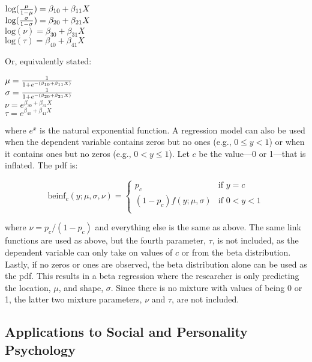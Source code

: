 \documentclass[english,man]{apa6}
\theoremstyle{definition}
\theoremstyle{definition}
\theoremstyle{remark}
\begin{document}
\begin{center}
$\text{log}({\mu \over 1 - \mu}) = \beta_{10} + \beta_{11}X$\\
$\text{log}({\sigma \over 1 - \sigma}) = \beta_{20} + \beta_{21}X$\\
$\text{log}(\nu) = \beta_{30} + \beta_{31}X$\\
$\text{log}(\tau) = \beta_{40} + \beta_{41}X$
\end{center}

Or, equivalently stated:

\begin{center}
$\mu={1\over1+e^{-(\beta_{10}+\beta_{11}X)}}$\\
$\sigma={1\over1+e^{-(\beta_{20}+\beta_{21}X)}}$\\
$\nu = e^{\beta_{30} + \beta_{31}X}$\\
$\tau = e^{\beta_{40} + \beta_{41}X}$
\end{center}

where \(e^x\) is the natural exponential function. A regression model
can also be used when the dependent variable contains zeros but no ones
(e.g., \(0 \leq y < 1\)) or when it contains ones but no zeros (e.g.,
\(0 < y \leq 1\)). Let \(c\) be the value---0 or 1---that is inflated.
The pdf is:

\begin{center}
\[
\text{beinf}_c(y;\mu,\sigma,\nu) =
\begin{cases}
  p_c                             & \text{if } y = c\\
  (1 - p_c)f(y;\mu,\sigma)        & \text{if } 0 < y < 1\\
\end{cases}
\]
\end{center}

where \(\nu = p_c / (1 - p_c)\) and everything else is the same as
above. The same link functions are used as above, but the fourth
parameter, \(\tau\), is not included, as the dependent variable can only
take on values of \(c\) or from the beta distribution. Lastly, if no
zeros or ones are observed, the beta distribution alone can be used as
the pdf. This results in a beta regression where the researcher is only
predicting the location, \(\mu\), and shape, \(\sigma\). Since there is
no mixture with values of being 0 or 1, the latter two mixture
parameters, \(\nu\) and \(\tau\), are not included.

\subsection{Applications to Social and Personality
Psychology}\label{applications-to-social-and-personality-psychology}
\end{document}
